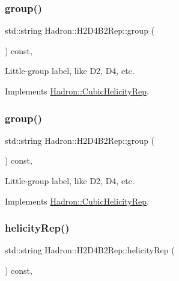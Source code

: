 \subsubsection{\texorpdfstring{group()}{group()}\hspace{0.1cm}{\footnotesize\ttfamily [2/3]}}
{\footnotesize\ttfamily std\+::string Hadron\+::\+H2\+D4\+B2\+Rep\+::group (\begin{DoxyParamCaption}{ }\end{DoxyParamCaption}) const\hspace{0.3cm}{\ttfamily [inline]}, {\ttfamily [virtual]}}

Little-\/group label, like D2, D4, etc. 

Implements \mbox{\hyperlink{structHadron_1_1CubicHelicityRep_a101a7d76cd8ccdad0f272db44b766113}{Hadron\+::\+Cubic\+Helicity\+Rep}}.

\mbox{\label{structHadron_1_1H2D4B2Rep_a48ee68e2c92450c822756a18a840be70}} 
\subsubsection{\texorpdfstring{group()}{group()}\hspace{0.1cm}{\footnotesize\ttfamily [3/3]}}
{\footnotesize\ttfamily std\+::string Hadron\+::\+H2\+D4\+B2\+Rep\+::group (\begin{DoxyParamCaption}{ }\end{DoxyParamCaption}) const\hspace{0.3cm}{\ttfamily [inline]}, {\ttfamily [virtual]}}

Little-\/group label, like D2, D4, etc. 

Implements \mbox{\hyperlink{structHadron_1_1CubicHelicityRep_a101a7d76cd8ccdad0f272db44b766113}{Hadron\+::\+Cubic\+Helicity\+Rep}}.

\mbox{\label{structHadron_1_1H2D4B2Rep_a1ec65d13eaf3747ef59295d3cd1aa002}} 
\subsubsection{\texorpdfstring{helicityRep()}{helicityRep()}\hspace{0.1cm}{\footnotesize\ttfamily [1/2]}}
{\footnotesize\ttfamily std\+::string Hadron\+::\+H2\+D4\+B2\+Rep\+::helicity\+Rep (\begin{DoxyParamCaption}{ }\end{DoxyParamCaption}) const\hspace{0.3cm}{\ttfamily [inline]}, {\ttfamily [virtual]}}

